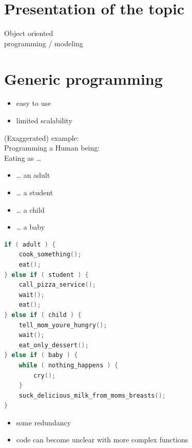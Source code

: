 \section*{Presentation of the topic}

\begin{frame}
\begin{center}
\LARGE Object oriented\\programming / modeling
\end{center}
\end{frame}

\section*{Generic programming}

\begin{frame}
\begin{itemize}
\setlength\itemsep{3em}
\item easy to use %
\item limited scalability %
\end{itemize}
\end{frame}

\begin{frame}
(Exaggerated) example:\bigskip\\
Programming a Human being:\medskip\\
Eating as …
\begin{itemize}
\setlength\itemsep{1em}
\item … an adult
\item … a student
\item … a child
\item … a baby
\end{itemize}
\end{frame}

\begin{frame}[fragile]
\begin{lstlisting}[language=C]
if ( adult ) {
	cook_something();
	eat();
} else if ( student ) {
	call_pizza_service();
	wait();
	eat();
} else if ( child ) {
	tell_mom_youre_hungry();
	wait();
	eat_only_dessert();
} else if ( baby ) {
	while ( nothing_happens ) {
		cry();
	}
	suck_delicious_milk_from_moms_breasts();
}
\end{lstlisting}
\end{frame}

\begin{frame}
\begin{itemize}
\setlength\itemsep{3em}
\item some redundancy
\item code can become unclear with more complex functions
\end{itemize}
\end{frame}

